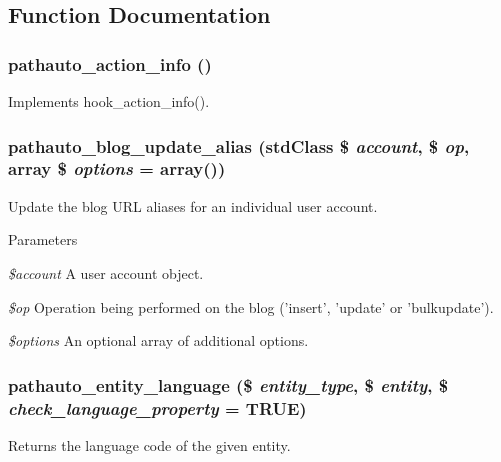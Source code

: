 \subsection{Function Documentation}
\hypertarget{pathauto_8module_a8ebf96e9fad62e05a7ea60bc34c85400}{
\subsubsection[{pathauto\_\-action\_\-info}]{\setlength{\rightskip}{0pt plus 5cm}pathauto\_\-action\_\-info ()}}
\label{pathauto_8module_a8ebf96e9fad62e05a7ea60bc34c85400}
Implements hook\_\-action\_\-info(). \hypertarget{pathauto_8module_a7858e5dd55ede23c8dcee1da3513508a}{
\subsubsection[{pathauto\_\-blog\_\-update\_\-alias}]{\setlength{\rightskip}{0pt plus 5cm}pathauto\_\-blog\_\-update\_\-alias (stdClass \$ {\em account}, \/  \$ {\em op}, \/  array \$ {\em options} = {\ttfamily array()})}}
\label{pathauto_8module_a7858e5dd55ede23c8dcee1da3513508a}
Update the blog URL aliases for an individual user account.


\begin{DoxyParams}{Parameters}
\item[{\em \$account}]A user account object. \item[{\em \$op}]Operation being performed on the blog ('insert', 'update' or 'bulkupdate'). \item[{\em \$options}]An optional array of additional options. \end{DoxyParams}
\hypertarget{pathauto_8module_adef1a563cfdf18667ce09e30bacc5dd6}{
\subsubsection[{pathauto\_\-entity\_\-language}]{\setlength{\rightskip}{0pt plus 5cm}pathauto\_\-entity\_\-language (\$ {\em entity\_\-type}, \/  \$ {\em entity}, \/  \$ {\em check\_\-language\_\-property} = {\ttfamily TRUE})}}
\label{pathauto_8module_adef1a563cfdf18667ce09e30bacc5dd6}
Returns the language code of the given entity.


